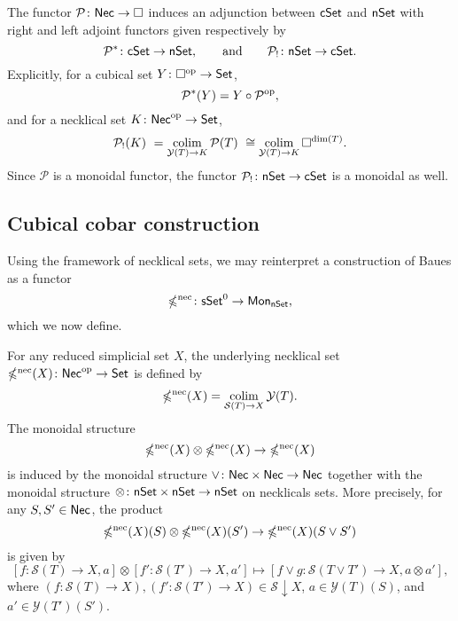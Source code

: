 The functor $\mathcal{P} \colon \mathsf{Nec} \to \square$ induces an adjunction between $\mathsf{cSet}$ and $\mathsf{nSet}$ with right and left adjoint functors given respectively by
\begin{equation*}
\mathcal{P}^\ast \colon \mathsf{cSet} \to \mathsf{nSet},
\qquad \text{and} \qquad
\mathcal{P}_{!}  \colon \mathsf{nSet} \to \mathsf{cSet}.
\end{equation*}
Explicitly, for a cubical set $Y \colon \square^{\mathrm{op}} \to \mathsf{Set}$,
\begin{equation*}
\mathcal{P}^\ast(Y)= Y \circ \mathcal{P}^{\mathrm{op}},
\end{equation*}
and for a necklical set $K \colon \mathsf{Nec}^{\mathrm{op}} \to \mathsf{Set}$,
\begin{equation*}
\mathcal{P}_{!}(K) \ =
\operatorname*{colim}_{\mathcal{Y}(T) \to K} \mathcal{P}(T) \ \cong 
\operatorname*{colim}_{\mathcal{Y}(T) \to K} \square^{\text{dim}(T)}.
\end{equation*}
Since $\mathcal{P}$ is a monoidal functor, the functor $\mathcal{P}_{!} \colon \mathsf{nSet} \to \mathsf{cSet}$ is a monoidal as well.

\subsection{Cubical cobar construction}

Using the framework of necklical sets, we may reinterpret a construction of Baues as a functor
\begin{equation*}
\operatorname{\mathbb{\Omega}^{\mathrm{nec}}} \colon \mathsf{sSet}^0 \to \mathsf{Mon}_{\mathsf{nSet}},
\end{equation*}
which we now define.

For any reduced simplicial set $X$, the underlying necklical set $\operatorname{\mathbb{\Omega}^{\mathrm{nec}}}(X) \colon \mathsf{Nec}^{\mathrm{op}} \to \mathsf{Set}$ is defined by
\begin{equation*}
\operatorname{\mathbb{\Omega}^{\mathrm{nec}}}(X) = \operatorname*{colim}_{\mathcal{S}(T) \to X} \mathcal{Y}(T).
\end{equation*}
The monoidal structure
$$\operatorname{\mathbb{\Omega}^{\mathrm{nec}}}(X) \otimes \operatorname{\mathbb{\Omega}^{\mathrm{nec}}}(X) \to \operatorname{\mathbb{\Omega}^{\mathrm{nec}}}(X)$$
is induced by the monoidal structure $\vee \colon \mathsf{Nec} \times \mathsf{Nec} \to \mathsf{Nec}$ together with the monoidal structure $\otimes \colon \mathsf{nSet} \times \mathsf{nSet} \to \mathsf{nSet}$ on necklicals sets.
More precisely, for any $S, S' \in \mathsf{Nec}$, the product $$\operatorname{\mathbb{\Omega}^{\mathrm{nec}}}(X)(S) \otimes \operatorname{\mathbb{\Omega}^{\mathrm{nec}}}(X)(S') \to \operatorname{\mathbb{\Omega}^{\mathrm{nec}}}(X)(S \vee S')$$ is given by $$[f\colon \mathcal{S}(T) \to X, a] \otimes [f'\colon \mathcal{S}(T') \to X, a'] \mapsto [f \vee g\colon \mathcal{S}(T\vee T') \to X, a \otimes  a'],$$
where $(f\colon \mathcal{S}(T) \to X), (f'\colon \mathcal{S}(T') \to X) \in \mathcal{S} \downarrow X$, $a\in \mathcal{Y}(T)(S)$, and $a'\in \mathcal{Y}(T')(S')$.


